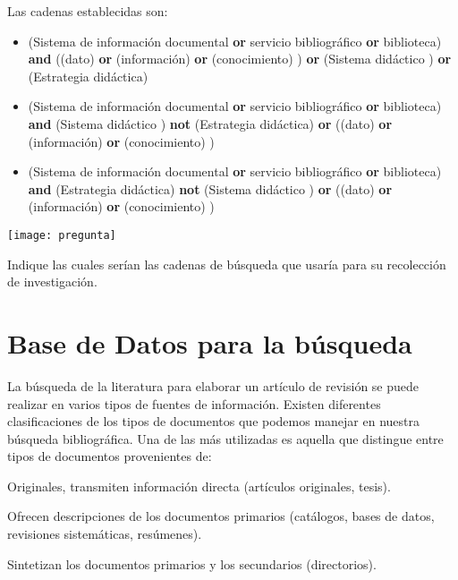 Las cadenas establecidas son:
\begin{itemize}
	\item (Sistema de información documental \textbf{or} servicio bibliográfico \textbf{or} biblioteca) \textbf{and} ((dato) \textbf{or} (información) \textbf{or} (conocimiento) ) \textbf{or} (Sistema didáctico ) \textbf{or}  (Estrategia didáctica)
	
	\item (Sistema de información documental \textbf{or} servicio bibliográfico \textbf{or} biblioteca) \textbf{and} (Sistema didáctico ) \textbf{not} (Estrategia didáctica) \textbf{or} ((dato) \textbf{or} (información) \textbf{or} (conocimiento) ) 
	
	\item (Sistema de información documental \textbf{or} servicio bibliográfico \textbf{or} biblioteca) \textbf{and} (Estrategia didáctica) \textbf{not} (Sistema didáctico )  \textbf{or} ((dato) \textbf{or} (información) \textbf{or} (conocimiento) ) 
\end{itemize}

 \begin{marginfigure}[-1.2cm]%
 	\texttt{[image: pregunta]}
 \end{marginfigure}

\begin{kaobox}[frametitle= Ejercicio]
Indique las cuales serían las cadenas de búsqueda que usaría para su recolección de investigación. 	
\end{kaobox}


 
 \section{Base de Datos para la búsqueda}

 La búsqueda de la literatura para elaborar un artículo de revisión se puede realizar en varios tipos de fuentes de información. Existen diferentes clasificaciones de los tipos de documentos que podemos manejar en nuestra búsqueda bibliográfica. 
 Una de las más utilizadas es aquella que distingue entre tipos de documentos provenientes de:
 

 
 \begin{description}  
 	\item[Fuentes primarias.] Originales, transmiten información directa (artículos originales, tesis).
 	
 	\item[Fuentes secundarias.] Ofrecen descripciones de los documentos primarios (catálogos, bases de datos, revisiones sistemáticas, resúmenes). 
 	
 	\item[Fuentes Terciarias.] Sintetizan los documentos primarios y los secundarios (directorios).
 \end{description}
 
